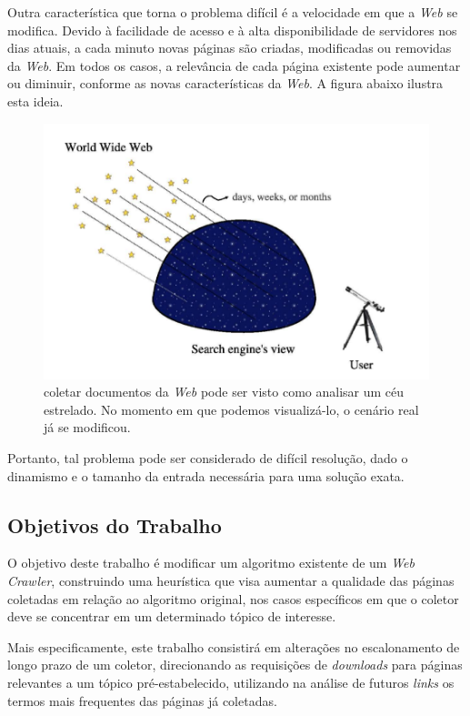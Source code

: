 \documentclass[a4paper,12pt,titlepage]{article}
\begin{document}
Outra característica que torna o problema difícil é a velocidade em que a \textit{Web} se modifica. Devido à facilidade de acesso e à alta disponibilidade de servidores nos dias atuais, a cada minuto novas páginas são criadas, modificadas ou removidas da \textit{Web}. Em todos os casos, a relevância de cada página existente pode aumentar ou diminuir, conforme as novas características da \textit{Web}. A figura abaixo ilustra esta ideia.

\begin{figure}[H]
     \centering
     \includegraphics[scale=0.3]{figures/stars.png}
     \caption{coletar documentos da \textit{Web} pode ser visto como analisar um céu estrelado. No momento em que podemos visualizá-lo, o cenário real já se modificou.}
     \label{bsp}
\end{figure}

Portanto, tal problema pode ser considerado de difícil resolução, dado o dinamismo e o tamanho da entrada necessária para uma solução exata.

\subsection{Objetivos do Trabalho}

O objetivo deste trabalho é modificar um algoritmo existente de um \textit{Web Crawler}, construindo uma heurística que visa aumentar a qualidade das páginas coletadas em relação ao algoritmo original, nos casos específicos em que o coletor deve se concentrar em um determinado tópico de interesse.

Mais especificamente, este trabalho consistirá em alterações no escalonamento de longo prazo de um coletor, direcionando as requisições de \textit{downloads} para páginas relevantes a um tópico pré-estabelecido, utilizando na análise de futuros \textit{links} os termos mais frequentes das páginas já coletadas.
\end{document}
